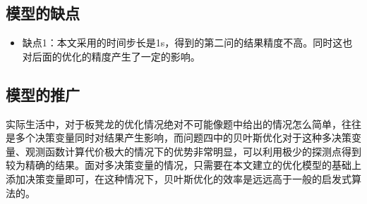 \documentclass[withoutpreface,bwprint]{cumcmthesis}
\begin{document}
\subsection{模型的缺点}
\begin{itemize}[itemindent=2em]
\item 缺点1：本文采用的时间步长是1s，得到的第二问的结果精度不高。同时这也对后面的优化的精度产生了一定的影响。
\end{itemize}

\subsection{模型的推广}

实际生活中，对于板凳龙的优化情况绝对不可能像题中给出的情况怎么简单，往往是多个决策变量同时对结果产生影响，而问题四中的贝叶斯优化对于这种多决策变量、观测函数计算代价极大的情况下的优势非常明显，可以利用极少的探测点得到较为精确的结果。面对多决策变量的情况，只需要在本文建立的优化模型的基础上添加决策变量即可，在这种情况下，贝叶斯优化的效率是远远高于一般的启发式算法的。


\nocite{*}
\end{document}

